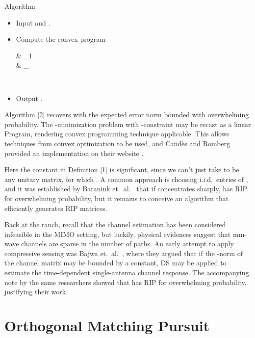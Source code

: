 \Result
{Algorithm}
{
\begin {itemize}
\item Input  and .
%
\item Compute the convex program
%
 {
\leftarrow \begin {cases}
 &  _1 \\
%
 \;  \quad &  _\infty \leq \g \\
\end {cases} \\
}
\item Output .
\end {itemize}
}

Algorithm [2] recovers  with the expected error norm bounded with overwhelming probability.
The -minimization problem with \m {\ell_\infty}-constraint may be recast as a linear Program, rendering convex programming technique applicable.
This allows techniques from convex optimization to be used, and Candès and Romberg provided an implementation on their website \cite {CaR05}.

Here the constant  in Definition [1] is significant, since we can't just take  to be any unitary matrix, for which .
A common approach is choosing i.i.d.\ entries of , and it was established by Baraniuk et.\ al.\ \cite {BDD08} that if  concentrates sharply,  has RIP for overwhelming probability, but it remains to conceive an algorithm that efficiently generates RIP matrices.

Back at the ranch, recall that the channel estimation has been considered infeasible in the MIMO setting, but luckily, physical evidences suggest that mm-wave channels are sparse in the number of paths.
An early attempt to apply compressive sensing was Bajwa et.\ al.\ \cite {BHS10}, where they argued that if the -norm of the channel matrix may be bounded by a constant, DS may be applied to estimate the time-dependent single-antenna channel response.
The accompanying note by the same researchers \cite {BHR08} showed that  has RIP for overwhelming probability, justifying their work.



\section {Orthogonal Matching Pursuit}

